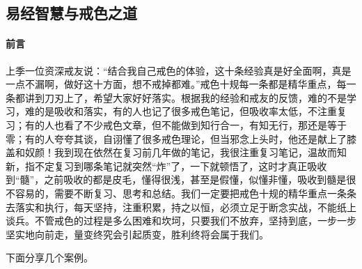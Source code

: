 \subsection{易经智慧与戒色之道}

\paragraph*{前言}

上季一位资深戒友说：“结合我自己戒色的体验，这十条经验真是好全面啊，真是一点不漏啊，做好这十方面，想不戒掉都难。”戒色十规每一条都是精华重点，每一条都讲到刀刃上了，希望大家好好落实。根据我的经验和戒友的反馈，难的不是学习，难的是吸收和落实，有的人也记了很多戒色笔记，但吸收率太低，不注重复习；有的人也看了不少戒色文章，但不能做到知行合一，有知无行，那还是等于零；有的人夸夸其谈，自诩懂了很多戒色理论，但当邪念上头时，他还是献上了膝盖和奴颜！我到现在依然在复习前几年做的笔记，我很注重复习笔记，温故而知新，指不定复习到哪条笔记就突然“炸”了，一下就顿悟了，这时才真正吸收到“髓”，之前吸收的都是皮毛，懂得很浅，甚至是假懂，似懂非懂，吸收到髓是很不容易的，需要不断复习、思考和总结。我们一定要把戒色十规的精华重点一条条去落实和执行，每天坚持，注重积累，持之以恒，必须立足于断念实战，不能纸上谈兵。不管戒色的过程是多么困难和坎坷，只要我们不放弃，坚持到底，一步一步坚实地向前走，量变终究会引起质变，胜利终将会属于我们。

下面分享几个案例。

